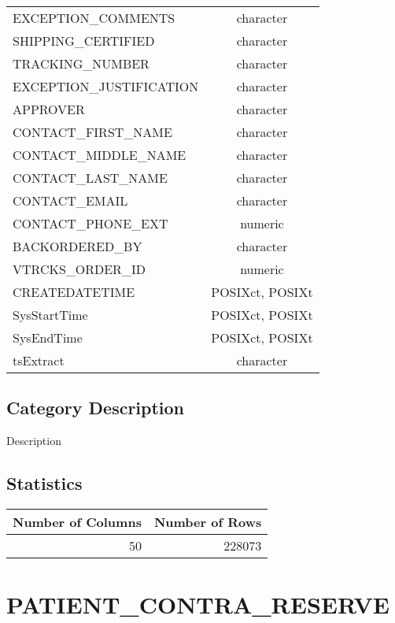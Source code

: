\documentclass[
  letterpaper,
  DIV=11,
  numbers=noendperiod]{scrreprt}
\begin{document}
\begin{longtable}{lc}
EXCEPTION\_COMMENTS & character \\ 
SHIPPING\_CERTIFIED & character \\ 
TRACKING\_NUMBER & character \\ 
EXCEPTION\_JUSTIFICATION & character \\ 
APPROVER & character \\ 
CONTACT\_FIRST\_NAME & character \\ 
CONTACT\_MIDDLE\_NAME & character \\ 
CONTACT\_LAST\_NAME & character \\ 
CONTACT\_EMAIL & character \\ 
CONTACT\_PHONE\_EXT & numeric \\ 
BACKORDERED\_BY & character \\ 
VTRCKS\_ORDER\_ID & numeric \\ 
CREATEDATETIME & POSIXct, POSIXt \\ 
SysStartTime & POSIXct, POSIXt \\ 
SysEndTime & POSIXct, POSIXt \\ 
tsExtract & character \\ 
\bottomrule
\end{longtable}

\hypertarget{category-description-24}{%
\section*{Category Description}\label{category-description-24}}

Description

\hypertarget{statistics-24}{%
\section*{Statistics}\label{statistics-24}}

\begin{longtable}{rr}
\toprule
Number of Columns & Number of Rows \\ 
\midrule
50 & 228073 \\ 
\bottomrule
\end{longtable}

\hypertarget{patient_contra_reserve}{%
\chapter*{PATIENT\_CONTRA\_RESERVE}\label{patient_contra_reserve}}
\end{document}
